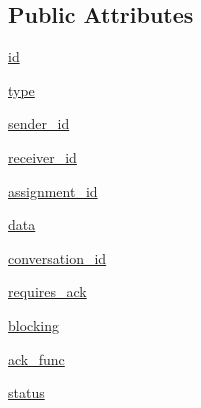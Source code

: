 \subsection*{Public Attributes}
\begin{DoxyCompactItemize}
\item 
\hyperlink{classparlai_1_1mturk_1_1core_1_1legacy__2018_1_1socket__manager_1_1Packet_ae539e80c978b6fa4ac0332cb8fdb4459}{id}
\item 
\hyperlink{classparlai_1_1mturk_1_1core_1_1legacy__2018_1_1socket__manager_1_1Packet_ab3209be95628003e108788a9ac459206}{type}
\item 
\hyperlink{classparlai_1_1mturk_1_1core_1_1legacy__2018_1_1socket__manager_1_1Packet_a4aa15cc8e64d313e3f22546df8738ba5}{sender\+\_\+id}
\item 
\hyperlink{classparlai_1_1mturk_1_1core_1_1legacy__2018_1_1socket__manager_1_1Packet_af58d168251594cf0de296a96e9772d51}{receiver\+\_\+id}
\item 
\hyperlink{classparlai_1_1mturk_1_1core_1_1legacy__2018_1_1socket__manager_1_1Packet_a3ffd9aa8c6038c62d5ce56cc730ab354}{assignment\+\_\+id}
\item 
\hyperlink{classparlai_1_1mturk_1_1core_1_1legacy__2018_1_1socket__manager_1_1Packet_adcb59e4297d2ac5842f963591a2c8aff}{data}
\item 
\hyperlink{classparlai_1_1mturk_1_1core_1_1legacy__2018_1_1socket__manager_1_1Packet_add03541844fbd3e7fdb9260b6c67f444}{conversation\+\_\+id}
\item 
\hyperlink{classparlai_1_1mturk_1_1core_1_1legacy__2018_1_1socket__manager_1_1Packet_af9b94a2fd15ede3a9abe55e7d361932c}{requires\+\_\+ack}
\item 
\hyperlink{classparlai_1_1mturk_1_1core_1_1legacy__2018_1_1socket__manager_1_1Packet_a0545e4302a6a6c212479c583009b00d1}{blocking}
\item 
\hyperlink{classparlai_1_1mturk_1_1core_1_1legacy__2018_1_1socket__manager_1_1Packet_ab0512c9df9c767ce809ae9a93a80dae6}{ack\+\_\+func}
\item 
\hyperlink{classparlai_1_1mturk_1_1core_1_1legacy__2018_1_1socket__manager_1_1Packet_ab0a6d9a25edeacbd5450f630d363ee35}{status}
\end{DoxyCompactItemize}
